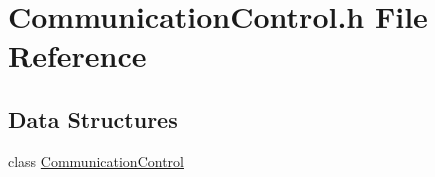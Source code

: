 \hypertarget{a00019}{\section{Communication\-Control.\-h File Reference}
\label{a00019}
}
\subsection*{Data Structures}
\begin{DoxyCompactItemize}
\item 
class \hyperlink{a00001}{Communication\-Control}
\end{DoxyCompactItemize}
